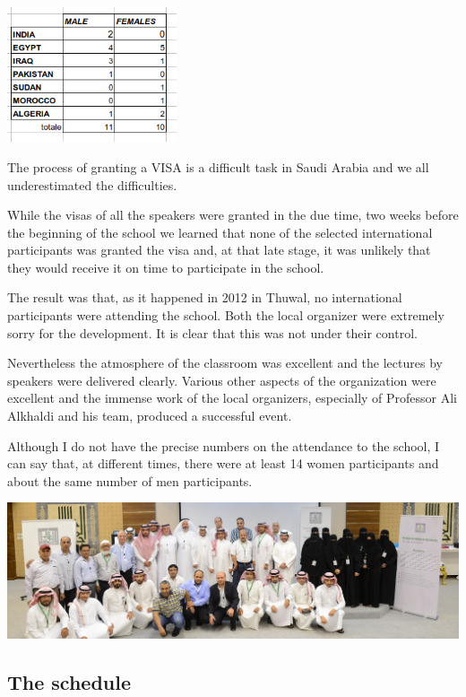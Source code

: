 \documentclass[12pt,a4paper]{scrartcl}
\begin{document}
\centerline{\includegraphics[width=5cm]{selected_partecipants.png}}\bigskip


The process of granting a VISA is a difficult task in Saudi Arabia and we all underestimated the difficulties. 

While the visas of all the speakers were granted in the due time, two weeks before the beginning of the school we learned that
none of the selected international participants was granted the visa and, at that late stage, it was unlikely that they would receive it on time to participate in the school.

The result was that, as it happened in 2012 in Thuwal, no international participants were attending the school. Both the local organizer were extremely sorry for the development. It is clear that this was not under their control. 

Nevertheless the atmosphere of the classroom was excellent and the lectures by speakers were delivered clearly. Various other aspects of the organization were excellent and the immense work of the local organizers, especially of Professor Ali Alkhaldi and
his team, produced a successful event. 

Although I do not have the precise numbers on the attendance to the school, I can say that, at different times, there were at least 14 women participants and about the same number of men participants.\bigskip

\centerline{\includegraphics[width=18cm]{group.jpg}}


\subsection*{The schedule}
\end{document}
